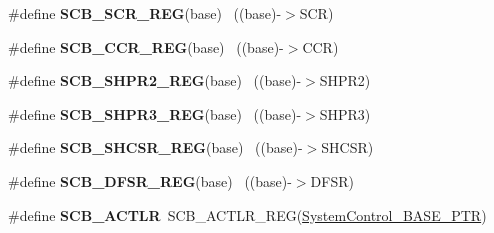 \begin{DoxyCompactItemize}
\item 
\hypertarget{group___s_c_b___register___accessor___macros_ga6cd310502ec11012af2420c92138fb04}{}\#define {\bfseries S\+C\+B\+\_\+\+S\+C\+R\+\_\+\+R\+E\+G}(base)                                            ~((base)-\/$>$S\+C\+R)\label{group___s_c_b___register___accessor___macros_ga6cd310502ec11012af2420c92138fb04}

\item 
\hypertarget{group___s_c_b___register___accessor___macros_gae2955c3c122b0cd8454d0015bcac2780}{}\#define {\bfseries S\+C\+B\+\_\+\+C\+C\+R\+\_\+\+R\+E\+G}(base)                                            ~((base)-\/$>$C\+C\+R)\label{group___s_c_b___register___accessor___macros_gae2955c3c122b0cd8454d0015bcac2780}

\item 
\hypertarget{group___s_c_b___register___accessor___macros_gaeb160566ffdd3572f046e69f3b79e3e8}{}\#define {\bfseries S\+C\+B\+\_\+\+S\+H\+P\+R2\+\_\+\+R\+E\+G}(base)                                        ~((base)-\/$>$S\+H\+P\+R2)\label{group___s_c_b___register___accessor___macros_gaeb160566ffdd3572f046e69f3b79e3e8}

\item 
\hypertarget{group___s_c_b___register___accessor___macros_ga8c93949e94df4ece6b4fafd94cca708d}{}\#define {\bfseries S\+C\+B\+\_\+\+S\+H\+P\+R3\+\_\+\+R\+E\+G}(base)                                        ~((base)-\/$>$S\+H\+P\+R3)\label{group___s_c_b___register___accessor___macros_ga8c93949e94df4ece6b4fafd94cca708d}

\item 
\hypertarget{group___s_c_b___register___accessor___macros_ga84042bf531b908ba8afa2bb260acfdb1}{}\#define {\bfseries S\+C\+B\+\_\+\+S\+H\+C\+S\+R\+\_\+\+R\+E\+G}(base)                                        ~((base)-\/$>$S\+H\+C\+S\+R)\label{group___s_c_b___register___accessor___macros_ga84042bf531b908ba8afa2bb260acfdb1}

\item 
\hypertarget{group___s_c_b___register___accessor___macros_ga2ac45bf07176acb69b71189cddba46dc}{}\#define {\bfseries S\+C\+B\+\_\+\+D\+F\+S\+R\+\_\+\+R\+E\+G}(base)                                          ~((base)-\/$>$D\+F\+S\+R)\label{group___s_c_b___register___accessor___macros_ga2ac45bf07176acb69b71189cddba46dc}

\item 
\hypertarget{group___s_c_b___register___accessor___macros_ga2a94c61032c2b326d148f402585f66f4}{}\#define {\bfseries S\+C\+B\+\_\+\+A\+C\+T\+L\+R}~S\+C\+B\+\_\+\+A\+C\+T\+L\+R\+\_\+\+R\+E\+G(\hyperlink{group___s_c_b___peripheral_gaf22864785770f832103e904244e078cb}{System\+Control\+\_\+\+B\+A\+S\+E\+\_\+\+P\+T\+R})\label{group___s_c_b___register___accessor___macros_ga2a94c61032c2b326d148f402585f66f4}


\end{DoxyCompactItemize}
